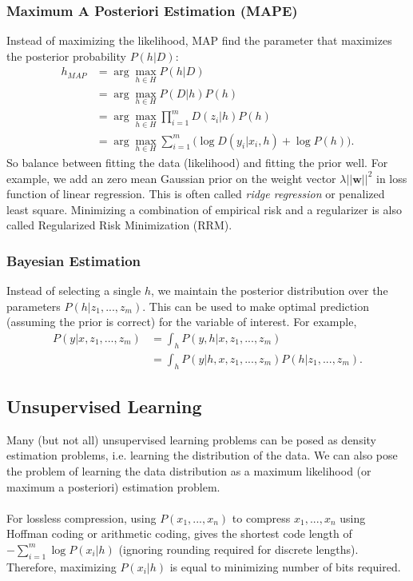 \documentclass{article}
\begin{document}
    \subsubsection{Maximum A Posteriori Estimation (MAPE)}
    Instead of maximizing the likelihood, MAP find the parameter that maximizes the posterior probability $P(h|D)$:
    \begin{align}
    h_{MAP} &= \arg \max_{h \in H} P(h|D) \\
    		&= \arg \max_{h \in H} P(D|h)P(h) \\
            &= \arg \max_{h \in H} \prod_{i=1}^m D(z_i|h)P(h) \\
            &= \arg \max_{h \in H} \sum_{i=1}^m \Big( \log D(y_i|x_i, h) + \log P(h) \Big).
    \end{align}
    So balance between fitting the data (likelihood) and fitting the prior well. For example, we add an zero mean Gaussian prior on the weight vector $\lambda ||\textbf{w}||^2$ in loss function of linear regression. This is often called \textit{ridge regression} or penalized least square. Minimizing a combination of empirical risk and a regularizer is also called Regularized Risk Minimization (RRM).
    
    \subsubsection{Bayesian Estimation}
    Instead of selecting a single $h$, we maintain the posterior distribution over the parameters $P(h|z_1,...,z_m)$. This can be used to make optimal prediction (assuming the prior is correct) for the variable of interest. For example, 
    \begin{align}
    P(y|x,z_1,...,z_m) &= \int_h P(y,h|x,z_1,...,z_m) \\
    				   &= \int_h P(y|h,x,z_1,...,z_m) P(h|z_1,...,z_m).
    \end{align}
    
    
    \subsection{Unsupervised Learning}
    Many (but not all) unsupervised learning problems can be posed as density estimation problems, i.e. learning the distribution of the data. We can also pose the problem of learning the data distribution as a maximum likelihood (or maximum a posteriori) estimation problem. 
    \\\\
    For lossless compression, using $P(x_1,...,x_n)$ to compress $x_1,...,x_n$ using Hoffman coding or arithmetic coding, gives the  shortest code length of $-\sum_{i=1}^m \log P(x_i|h)$ (ignoring rounding required for discrete lengths). Therefore, maximizing $P(x_i|h)$ is equal to minimizing number of bits required.
    
\end{document}
